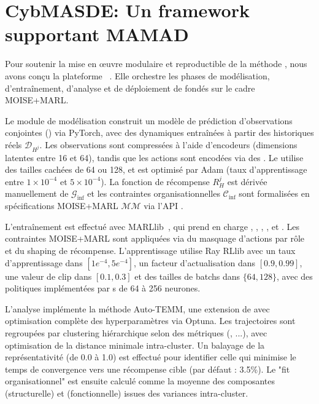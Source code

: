 \chapter{CybMASDE: Un framework supportant MAMAD}
\label{sec:cybmasde}

Pour soutenir la mise en œuvre modulaire et reproductible de la méthode , nous avons conçu la plateforme ~\footnotemark[1]. Elle orchestre les phases de modélisation, d'entraînement, d'analyse et de déploiement de  fondés sur le cadre MOISE+MARL.


Le module de modélisation construit un modèle de prédiction d'observations conjointes () via PyTorch, avec des dynamiques  entraînées à partir des historiques réels $\mathcal{D}_{H^j}$. Les observations sont compressées à l'aide d'encodeurs  (dimensions latentes entre 16 et 64), tandis que les actions sont encodées via des . Le  utilise des tailles cachées de 64 ou 128, et est optimisé par Adam (taux d'apprentissage entre $1 \times 10^{-4}$ et $5 \times 10^{-4}$). La fonction de récompense $R^j_H$ est dérivée manuellement de $\mathcal{G}_{\text{inf}}$ et les contraintes organisationnelles $\mathcal{C}_{\text{inf}}$ sont formalisées en spécifications MOISE+MARL $\mathcal{MM}$ via l'API .

L'entraînement est effectué avec MARLlib~\cite{hu2022marllib}, qui prend en charge , , , ,  et . Les contraintes MOISE+MARL sont appliquées via du masquage d'actions par rôle et du shaping de récompense. L'apprentissage utilise Ray RLlib avec un taux d'apprentissage dans $[1e^{-4}, 5e^{-4}]$, un facteur d'actualisation dans $[0.9, 0.99]$, une valeur de clip  dans $[0.1, 0.3]$ et des tailles de batchs dans $\{64, 128\}$, avec des politiques implémentées par s de 64 à 256 neurones.

L'analyse implémente la méthode Auto-TEMM, une extension de  avec optimisation complète des hyperparamètres via Optuna. Les trajectoires sont regroupées par clustering hiérarchique selon des métriques (, ...), avec optimisation de la distance minimale intra-cluster. Un balayage de la représentativité (de 0.0 à 1.0) est effectué pour identifier celle qui minimise le temps de convergence vers une récompense cible (par défaut : 3.5\%). Le "fit organisationnel" est ensuite calculé comme la moyenne des composantes  (structurelle) et  (fonctionnelle) issues des variances intra-cluster.

